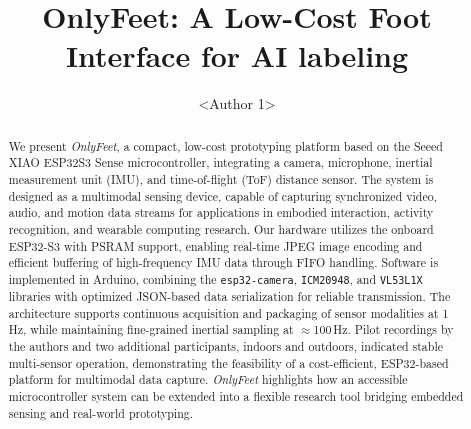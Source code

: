 \documentclass[manuscript,review,anonymous]{acmart}
\newcommand{\name}{OnlyFeet} %
\begin{document}
\title{\name: A Low-Cost Foot Interface for AI labeling}

\author{<Author 1>}
 
\renewcommand{\shortauthors}{<Surname> et al.}

\begin{abstract}
We present \textit{OnlyFeet}, a compact, low-cost prototyping platform based on the Seeed XIAO ESP32S3 Sense microcontroller, integrating a camera, microphone, inertial measurement unit (IMU), and time-of-flight (ToF) distance sensor. The system is designed as a multimodal sensing device, capable of capturing synchronized video, audio, and motion data streams for applications in embodied interaction, activity recognition, and wearable computing research. Our hardware utilizes the onboard ESP32-S3 with PSRAM support, enabling real-time JPEG image encoding and efficient buffering of high-frequency IMU data through FIFO handling. Software is implemented in Arduino, combining the \texttt{esp32-camera}, \texttt{ICM20948}, and \texttt{VL53L1X} libraries with optimized JSON-based data serialization for reliable transmission. The architecture supports continuous acquisition and packaging of sensor modalities at 1\,Hz, while maintaining fine-grained inertial sampling at $\approx$100\,Hz. Pilot recordings by the authors and two additional participants, indoors and outdoors, indicated stable multi-sensor operation, demonstrating the feasibility of a cost-efficient, ESP32-based platform for multimodal data capture. \textit{OnlyFeet} highlights how an accessible microcontroller system can be extended into a flexible research tool bridging embedded sensing and real-world prototyping.
\end{abstract}


\end{document}
